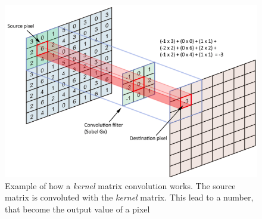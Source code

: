 \documentclass[12pt,a4paper,twocolumn]{article}
\begin{document}
				
			\begin{figure}[h!]
				\centering
				\includegraphics[width=0.7\linewidth]{images/kernel}
				\caption{Example of how a \emph{kernel} matrix convolution works. The source matrix is convoluted with the \emph{kernel} matrix. This lead to a number, that become the output value of a pixel}
				\label{fig:kernel}
			\end{figure}
			
		\newpage
		
		\printbibliography
\end{document}
